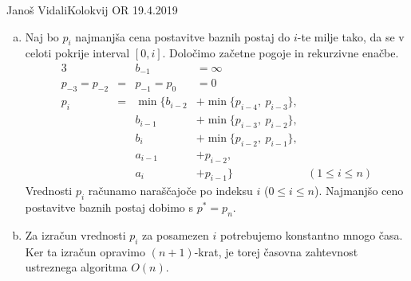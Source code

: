 \begin{naloga}{Janoš Vidali}{Kolokvij OR 19.4.2019}
\begin{odgovor}
\begin{enumerate}[(a)]
\item Naj bo $p_i$ najmanjša cena postavitve baznih postaj
do $i$-te milje tako,
da se v celoti pokrije interval $[0, i]$.
Določimo začetne pogoje in rekurzivne enačbe.
\begin{alignat*}{3}
&& b_{-1} &= \infty \\
p_{-3} = p_{-2} &=& p_{-1} = p_0 &= 0 \\
p_i &=&{} \min\{b_{i-2} &+ \min\{p_{i-4},\ p_{i-3}\}, \\
    & &         b_{i-1} &+ \min\{p_{i-3},\ p_{i-2}\}, \\
    & &         b_i &+ \min\{p_{i-2},\ p_{i-1}\}, \\
    & &         a_{i-1} &+ p_{i-2}, \\
    & &         a_i &+ p_{i-1}\} & (1 \le i \le n)
\end{alignat*}
Vrednosti $p_i$ računamo naraščajoče po indeksu $i$ ($0 \le i \le n$).
Najmanjšo ceno postavitve baznih postaj dobimo s $p^* = p_n$.

\item Za izračun vrednosti $p_i$ za posamezen $i$
potrebujemo konstantno mnogo časa.
Ker ta izračun opravimo $(n+1)$-krat,
je torej časovna zahtevnost ustreznega algoritma $O(n)$.


\end{enumerate}
\end{odgovor}
\end{naloga}
